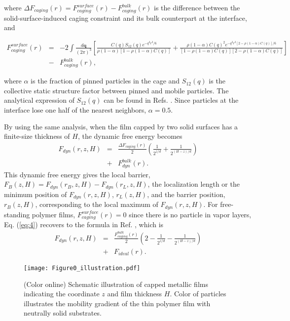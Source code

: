 \documentclass[twocolumn,preprintnumbers,amsmath,amssymb,superscriptaddress]{revtex4}
\begin{document}
where $\Delta F_{caging}(r)=F_{caging}^{surface}(r)-F_{caging}^{bulk}(r)$ is the difference between the solid-surface-induced caging constraint and its bulk counterpart at the interface, and
\begin{widetext}
\begin{eqnarray}
F_{caging}^{surface}(r) &=& -2\int\frac{d\mathbf{q}}{(2\pi)^3}\left[ \frac{C(q)S_{12}(q)e^{-q^2r^2/6}}{\rho(1-\alpha)\left[1- \rho(1-\alpha)C(q)\right]}+
\frac{\rho(1-\alpha)C(q)^2e^{-q^2r^2\left[2-\rho(1-\alpha)C(q) \right]/6}}{\left[1- \rho(1-\alpha)C(q)\right]\left[2- \rho(1-\alpha)C(q)\right]} \right] \nonumber\\
&-& F_{caging}^{bulk}(r),
\label{eq:3}
\end{eqnarray}
\end{widetext}
where $\alpha$ is the fraction of pinned particles in the cage and $S_{12}(q)$ is the collective static structure factor between pinned and mobile particles. The analytical expression of $S_{12}(q)$ can be found in Refs. \cite{3,4,12}. Since particles at the interface lose one half of the nearest neighbors, $\alpha = 0.5$.

By using the same analysis, when the film capped by two solid surfaces has a finite-size thickness of $H$, the dynamic free energy becomes
\begin{eqnarray}
F_{dyn}(r,z,H) &=& \frac{\Delta F_{caging}(r)}{2}\left(\frac{1}{2^{z/d}}+\frac{1}{2^{(H-z)/d}}\right)\nonumber\\
&+& F_{dyn}^{bulk}(r).
\label{eq:4}
\end{eqnarray}
This dynamic free energy gives the local barrier, $F_B(z,H)= F_{dyn}(r_B,z,H)-F_{dyn}(r_L,z,H)$, the localization length or the minimum position of $F_{dyn}(r,z,H)$, $r_L(z,H)$, and the barrier position, $r_B(z,H)$, corresponding to the local maximum of $F_{dyn}(r,z,H)$. For free-standing polymer films, $F_{caging}^{surface}(r)=0$ since there is no particle in vapor layers, Eq. (\ref{eq:4}) recovers to the formula in Ref. \cite{24}, which is
\begin{eqnarray}
F_{dyn}(r,z,H) &=& \frac{ F_{caging}^{bulk}(r)}{2}\left(2-\frac{1}{2^{z/d}}-\frac{1}{2^{(H-z)/d}}\right)\nonumber\\
&+& F_{ideal}(r).
\label{eq:4-1}
\end{eqnarray}

\begin{figure}[htp]
\texttt{[image: Figure0\_illustration.pdf]}
\caption{(Color online) Schematic illustration of capped metallic films indicating the coordinate $z$ and film thickness $H$. Color of particles illustrates the mobility gradient of the thin polymer film with neutrally solid substrates.}
\label{fig:0}
\end{figure}
\end{document}
